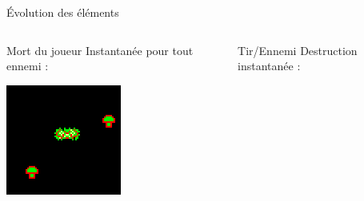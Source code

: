 \begin{frame}{Évolution des éléments}
	\begin{columns}
		\begin{column}{0.3\textwidth}
			\begin{block}{Mort du joueur}
				Instantanée pour tout ennemi :
				
				\smallskip
				\includegraphics[width=\textwidth]{imgs/mortNain.png}
			\end{block}
		\end{column}
		\begin{column}{0.3\textwidth}
			\begin{block}{Tir/Ennemi}
				Destruction instantanée :
				

\end{block}
\end{column}
\end{columns}
\end{frame}
